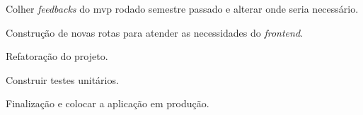 \begin{alineascomnumero}
    \item Colher \textit{feedbacks} do mvp rodado semestre passado e alterar onde seria necessário.
	\item Construção de novas rotas para atender as necessidades do \textit{frontend}.
	\item Refatoração do projeto.
	\item Construir testes unitários.
	\item Finalização e colocar a aplicação em produção.
\end{alineascomnumero}






